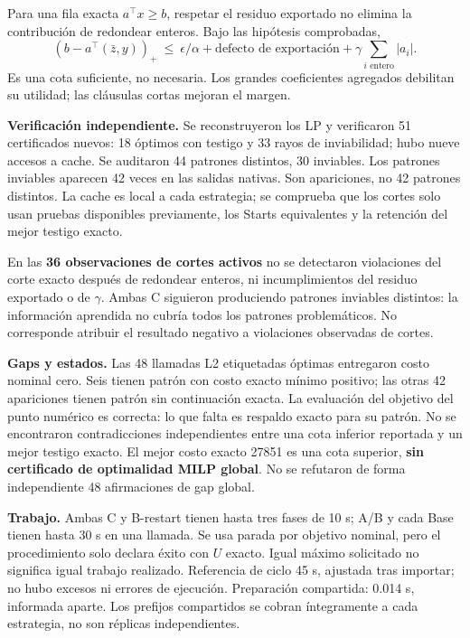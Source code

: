 \documentclass[10pt,a4paper]{article}
\begin{document}
Para una fila exacta $a^\top x\ge b$, respetar el residuo exportado no elimina
la contribución de redondear enteros. Bajo las hipótesis comprobadas,
\[
 (b-a^\top(\bar z,y))_+
 \ \le\ \epsilon/\alpha+\text{defecto de exportación}
       +\gamma\sum_{i\text{ entero}}|a_i|.
\]
Es una cota suficiente, no necesaria. Los grandes coeficientes agregados
debilitan su utilidad; las cláusulas cortas mejoran el margen.

\textbf{Verificación independiente.} Se reconstruyeron los LP y verificaron
51 certificados nuevos: 18 óptimos con testigo y 33 rayos de inviabilidad;
hubo nueve accesos a cache. Se auditaron 44 patrones distintos, 30 inviables.
Los patrones inviables aparecen 42 veces en las salidas nativas. Son
apariciones, no 42 patrones distintos. La cache es local a cada estrategia;
se comprueba que los cortes solo usan pruebas disponibles previamente,
los Starts equivalentes y la retención del mejor testigo exacto.

En las \textbf{36 observaciones de cortes activos} no se detectaron violaciones
del corte exacto después de redondear enteros, ni incumplimientos del residuo
exportado o de $\gamma$. Ambas C siguieron produciendo patrones inviables
distintos: la información aprendida no cubría todos los patrones problemáticos.
No corresponde atribuir el resultado negativo a violaciones observadas de cortes.

\textbf{Gaps y estados.} Las 48 llamadas L2 etiquetadas óptimas entregaron
costo nominal cero. Seis tienen patrón con costo exacto mínimo positivo; las
otras 42 apariciones tienen patrón sin continuación exacta. La evaluación
del objetivo del punto numérico es correcta: lo que falta es respaldo exacto
para su patrón. No se encontraron contradicciones independientes entre una
cota inferior reportada y un mejor testigo exacto. El mejor costo exacto
27851 es una cota superior, \textbf{sin certificado de optimalidad MILP global}.
No se refutaron de forma independiente 48 afirmaciones de gap global.

\textbf{Trabajo.} Ambas C y B-restart tienen hasta tres fases de 10 s;
A/B y cada Base tienen hasta 30 s en una llamada. Se usa parada por objetivo
nominal, pero el procedimiento solo declara éxito con $U$ exacto.
Igual máximo solicitado no significa igual trabajo realizado. Referencia de
ciclo 45 s, ajustada tras importar; no hubo excesos ni errores de ejecución.
Preparación compartida: 0.014 s, informada aparte. Los prefijos compartidos
se cobran íntegramente a cada estrategia, no son réplicas independientes.
\end{document}
